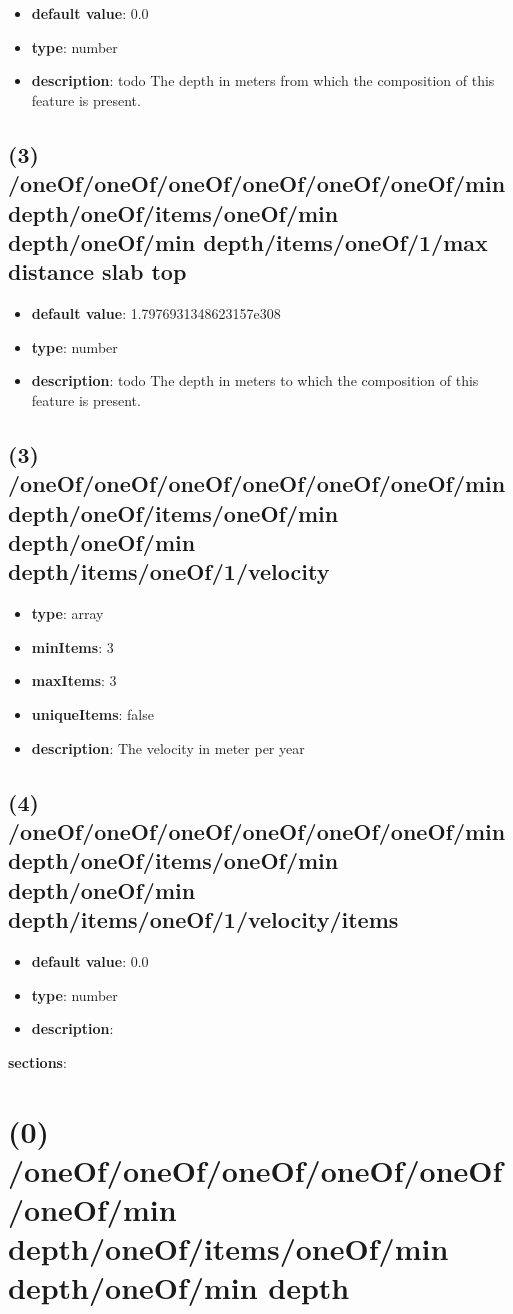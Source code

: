\begin{itemize}[leftmargin=3em]\item {\bf default value}: 0.0
\item {\bf type}: number
\item {\bf description}: todo The depth in meters from which the composition of this feature is present.
\end{itemize}\subsection{(3) /oneOf/oneOf/oneOf/oneOf/oneOf/oneOf/min depth/oneOf/items/oneOf/min depth/oneOf/min depth/items/oneOf/1/max distance slab top}
\begin{itemize}[leftmargin=3em]\item {\bf default value}: 1.7976931348623157e308
\item {\bf type}: number
\item {\bf description}: todo The depth in meters to which the composition of this feature is present.
\end{itemize}\subsection{(3) /oneOf/oneOf/oneOf/oneOf/oneOf/oneOf/min depth/oneOf/items/oneOf/min depth/oneOf/min depth/items/oneOf/1/velocity}
\begin{itemize}[leftmargin=3em]\item {\bf type}: array
\item {\bf minItems}: 3
\item {\bf maxItems}: 3
\item {\bf uniqueItems}: false
\item {\bf description}: The velocity in meter per year
\end{itemize}\subsection{(4) /oneOf/oneOf/oneOf/oneOf/oneOf/oneOf/min depth/oneOf/items/oneOf/min depth/oneOf/min depth/items/oneOf/1/velocity/items}
\begin{itemize}[leftmargin=4em]\item {\bf default value}: 0.0
\item {\bf type}: number
\item {\bf description}: 
\end{itemize}\item {\bf sections}: \section{(0) /oneOf/oneOf/oneOf/oneOf/oneOf/oneOf/min depth/oneOf/items/oneOf/min depth/oneOf/min depth}
